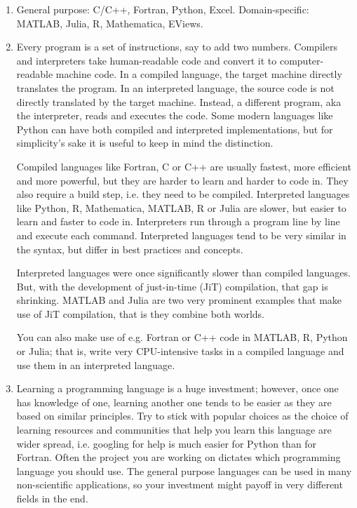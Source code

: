 \begin{enumerate}
\item General purpose: C/C++, Fortran, Python, Excel.
	Domain-specific: MATLAB, Julia, R, Mathematica, EViews.
\item Every program is a set of instructions, say to add two numbers. 
	Compilers and interpreters take human-readable code and convert it to computer-readable machine code.
	In a compiled language, the target machine directly translates the program.
	In an interpreted language, the source code is not directly translated by the target machine.
	Instead, a different program, aka the interpreter, reads and executes the code.
	Some modern languages like Python can have both compiled and interpreted implementations,
	  but for simplicity's sake it is useful to keep in mind the distinction.
		
	Compiled languages like Fortran, C or C++ are usually fastest, more efficient and more powerful,
	  but they are harder to learn and harder to code in.
	They also require a build step, i.e. they need to be compiled.
	Interpreted languages like Python, R, Mathematica, MATLAB, R or Julia are slower,
	  but easier to learn and faster to code in.
	Interpreters run through a program line by line and execute each command.
	Interpreted languages tend to be very similar in the syntax,
	  but differ in best practices and concepts.
	
	Interpreted languages were once significantly slower than compiled languages.
	But, with the development of just-in-time (JiT) compilation, that gap is shrinking.
	MATLAB and Julia are two very prominent examples that make use of JiT compilation,
	  that is they combine both worlds.

	You can also make use of e.g. Fortran or C++ code in MATLAB, R, Python or Julia;
	  that is, write very CPU-intensive tasks in a compiled language
	  and use them in an interpreted language.
	
\item Learning a programming language is a huge investment;
	however, once one has knowledge of one, learning another one tends to be easier
	  as they are based on similar principles.
	Try to stick with popular choices as the choice of learning resources and communities
	  that help you learn this language are wider spread,
	  i.e. googling for help is much easier for Python than for Fortran.
	Often the project you are working on dictates which programming language you should use.
	The general purpose languages can be used in many non-scientific applications,
	  so your investment might payoff in very different fields in the end. 
		

\end{enumerate}
